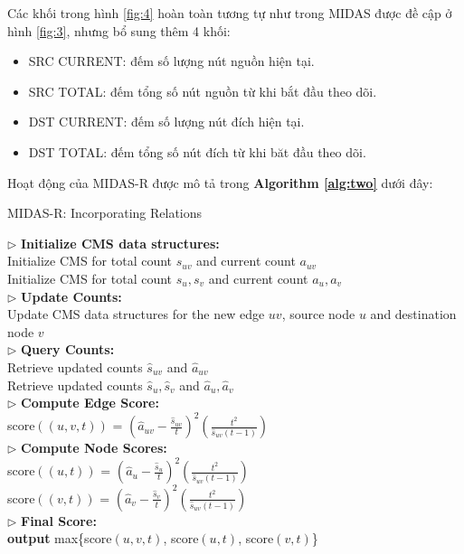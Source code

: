 Các khối trong hình \ref{fig:4} hoàn toàn tương tự như trong MIDAS được đề cập ở hình \ref{fig:3},
nhưng bổ sung thêm 4 khối:
\begin{itemize}
    \item SRC CURRENT: đếm số lượng nút nguồn hiện tại.
    \item SRC TOTAL: đếm tổng số nút nguồn từ khi bắt đầu theo dõi.
    \item DST CURRENT: đếm số lượng nút đích hiện tại.
    \item DST TOTAL: đếm tổng số nút đích từ khi băt đầu theo dõi.
\end{itemize}

Hoạt động của MIDAS-R được mô tả trong \textbf{Algorithm \ref*{alg:two}} dưới đây:

\begin{algorithm}[H]
    \caption{MIDAS-R: Incorporating Relations}\label{alg:two}
    $\triangleright$ \textbf{ Initialize CMS data structures:}\\
    Initialize CMS for total count $s_{uv}$ and current count $a_{uv}$\\
    Initialize CMS for total count $s_{u},s_{v}$ and current count $a_{u},a_{v}$\\
     {
        $\triangleright$  \textbf{Update Counts:}\\
        Update CMS data structures for the new edge $uv$, source node $u$ and destination node $v$\\
        $\triangleright$  \textbf{Query Counts:}\\
        Retrieve updated counts $\hat{s}_{uv}$ and $\hat{a}_{uv}$\\
        Retrieve updated counts $\hat{s}_{u}, \hat{s}_{v}$ and $\hat{a}_{u}, \hat{a}_{v}$\\
        $\triangleright$  \textbf{Compute Edge Score:}\\
        score$((u,v,t))$ = $(\hat{a}_{uv} - \frac{\hat{s}_{uv}}{t})^2(\frac{t^2}{\hat{s}_{uv}(t-1)})$\\
        $\triangleright$  \textbf{Compute Node Scores:}\\
        score$((u,t))$ = $(\hat{a}_{u} - \frac{\hat{s}_{u}}{t})^2(\frac{t^2}{\hat{s}_{uv}(t-1)})$\\
        score$((v,t))$ = $(\hat{a}_{v} - \frac{\hat{s}_{v}}{t})^2(\frac{t^2}{\hat{s}_{uv}(t-1)})$\\
        $\triangleright$  \textbf{Final Score:}\\
        \textbf{output} max\{score$(u,v,t)$, score$(u,t)$, score$(v,t)$\}
    }
\end{algorithm}

